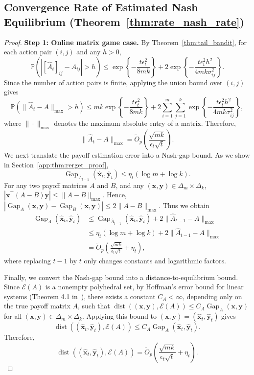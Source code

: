 \documentclass[12pt]{article}
\begin{document}
\subsection{Convergence Rate of Estimated Nash Equilibrium (Theorem~\ref{thm:rate_nash_rate})}
\label{app:thm:rate_nash_rate_proof}
\begin{proof}
\textbf{Step 1: Online matrix game case.}
By Theorem~\ref{thm:tail_bandit}, for each action pair $(i,j)$ and any $h>0$,
\[
\mathbb P\left(
\left|
[\widehat A_t]_{ij}-A_{ij}
\right|
> h
\right)
\le
\exp\left\{
-\frac{t\epsilon_t^2}{8mk}
\right\}
+
2\exp\left\{
-\frac{t\epsilon_t^2h^2}
{4mk\sigma_{ij}^2}
\right\}.
\]
Since the number of action pairs is finite, applying the union bound over $(i,j)$ gives
\[
\mathbb P\left(
\|\widehat A_t-A\|_{\max}
> h
\right)
\le
mk
\exp\left\{
-\frac{t\epsilon_t^2}{8mk}
\right\}
+2
\sum_{i=1}^m
\sum_{j=1}^k
\exp\left\{
-\frac{t\epsilon_t^2h^2}
{4mk\sigma_{ij}^2}
\right\},
\]
where $\|\cdot\|_{\max}$ denotes the maximum absolute entry of a matrix.
Therefore, 
\[
\|\widehat A_t-A\|_{\max}
=
\widetilde O_p
\left(
\frac{\sqrt{mk}}{\epsilon_t\sqrt t}
\right).
\]
We next translate the payoff estimation error into a Nash-gap bound. As we show in Section~\ref{app:thm:rerget_proof},
\[
\operatorname{Gap}_{\widehat A_{t-1}}
\left(
\widehat{\bm x}_t,
\widehat{\bm y}_t
\right)
\le
\eta_t(\log m+\log k).
\]
For any two payoff matrices $A$ and $B$, and any $(\bm x,\bm y)\in\Delta_m\times\Delta_k$, $\left|
\bm x^\top(A-B)\bm y
\right|
\le
\|A-B\|_{\max}$.
Hence,  $\left|
\operatorname{Gap}_{A}(\bm x,\bm y)
-
\operatorname{Gap}_{B}(\bm x,\bm y)
\right|
\le 2\|A-B\|_{\max}$.
Thus we obtain
\begin{align*}
\operatorname{Gap}_{A}
\left(
\widehat{\bm x}_t,
\widehat{\bm y}_t
\right)
&\le
\operatorname{Gap}_{\widehat A_{t-1}}
\left(
\widehat{\bm x}_t,
\widehat{\bm y}_t
\right)
+
2\|\widehat A_{t-1}-A\|_{\max} \\
&\le
\eta_t(\log m+\log k)
+
2\|\widehat A_{t-1}-A\|_{\max} \\
&=
\widetilde O_p
\left(
\frac{\sqrt{mk}}{\epsilon_t\sqrt t}
+
\eta_t
\right),
\end{align*}
where replacing $t-1$ by $t$ only changes constants and logarithmic factors.

Finally, we convert the Nash-gap bound into a distance-to-equilibrium bound. Since $\mathcal E(A)$ is a nonempty polyhedral set, by Hoffman's error bound for linear systems (Theorem 4.1 in~\cite{abderrahim2000hoffman}), there exists a constant $C_A<\infty$, depending only on the true payoff matrix $A$, such that $\operatorname{dist}\left((\bm x,\bm y),\mathcal E(A)\right)\le C_A \operatorname{Gap}_{A}(\bm x,\bm y)$
for all $(\bm x,\bm y)\in\Delta_m\times\Delta_k$. Applying this bound to
$(\bm x,\bm y)=(\widehat{\bm x}_t,\widehat{\bm y}_t)$ gives
\[
\operatorname{dist}
\left(
(\widehat{\bm x}_t,\widehat{\bm y}_t),
\mathcal E(A)
\right)
\le
C_A
\operatorname{Gap}_{A}
\left(
\widehat{\bm x}_t,
\widehat{\bm y}_t
\right).
\]
Therefore,
\[
\operatorname{dist}
\left(
(\widehat{\bm x}_t,\widehat{\bm y}_t),
\mathcal E(A)
\right)
=
\widetilde O_p
\left(
\frac{\sqrt{mk}}{\epsilon_t\sqrt t}
+ \eta_t
\right).
\]



\end{proof}
\end{document}
